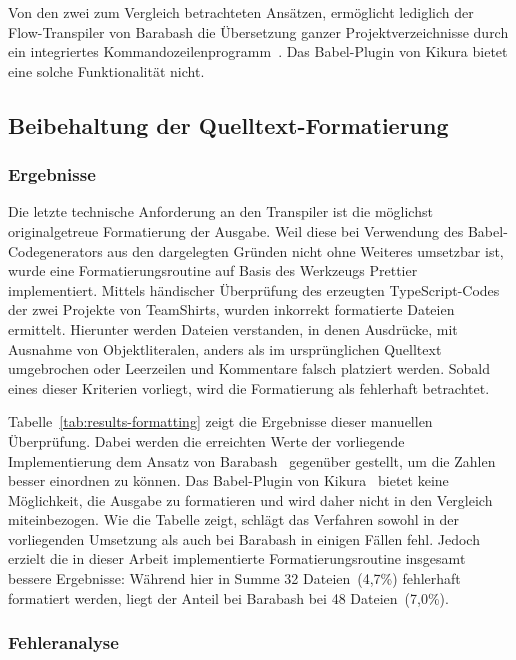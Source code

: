 Von den zwei zum Vergleich betrachteten Ansätzen, ermöglicht lediglich der Flow-Transpiler von Barabash die Übersetzung ganzer Projektverzeichnisse durch ein integriertes Kommandozeilenprogramm~\autocite{BARABASH:FLOW_TO_TS}. Das Babel-Plugin von Kikura bietet eine solche Funktionalität nicht.

\subsection{Beibehaltung der Quelltext-Formatierung}
\label{sec:results-formatting}

\subsubsection{Ergebnisse}

Die letzte technische Anforderung an den Transpiler ist die möglichst originalgetreue Formatierung der Ausgabe. Weil diese bei Verwendung des Babel-Codegenerators aus den dargelegten Gründen nicht ohne Weiteres umsetzbar ist, wurde eine Formatierungsroutine auf Basis des Werkzeugs Prettier~\autocite{SOFTWARE:PRETTIER} implementiert. Mittels händischer Überprüfung des erzeugten TypeScript-Codes der zwei Projekte von TeamShirts, wurden inkorrekt formatierte Dateien ermittelt. Hierunter werden Dateien verstanden, in denen Ausdrücke, mit Ausnahme von Objektliteralen, anders als im ursprünglichen Quelltext umgebrochen oder Leerzeilen und Kommentare falsch platziert werden. Sobald eines dieser Kriterien vorliegt, wird die Formatierung als fehlerhaft betrachtet.

Tabelle~\ref{tab:results-formatting} zeigt die Ergebnisse dieser manuellen Überprüfung. Dabei werden die erreichten Werte der vorliegende Implementierung dem Ansatz von Barabash~\autocite{BARABASH:FLOW_TO_TS} gegenüber gestellt, um die Zahlen besser einordnen zu können. Das Babel-Plugin von Kikura~\autocite{KIKURA:FLOW_TO_TS} bietet keine Möglichkeit, die Ausgabe zu formatieren und wird daher nicht in den Vergleich miteinbezogen.
Wie die Tabelle zeigt, schlägt das Verfahren sowohl in der vorliegenden Umsetzung als auch bei Barabash in einigen Fällen fehl. Jedoch erzielt die in dieser Arbeit implementierte Formatierungsroutine insgesamt bessere Ergebnisse: Während hier in Summe 32 Dateien~(4,7\%) fehlerhaft formatiert werden, liegt der Anteil bei Barabash bei 48 Dateien~(7,0\%).

\tablespace


\subsubsection{Fehleranalyse}

